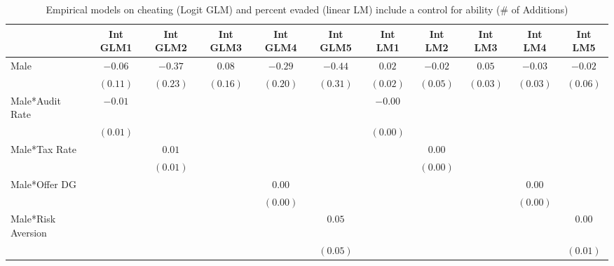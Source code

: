 
\begin{table}
\caption{Empirical models on cheating (Logit GLM) and percent evaded (linear LM) include a control for ability (\# of Additions)}
\begin{center}
\begin{tabular}{l c c c c c c c c c c }
\hline
 & Int GLM1 &  Int GLM2  & Int GLM3 & Int GLM4 & Int GLM5 & Int LM1 &  Int LM2  & Int LM3 & Int LM4 & Int LM5 \\
\hline
Male               & $-0.06$       & $-0.37$      & $0.08$        & $-0.29$       & $-0.44$      & $0.02$        & $-0.02$      & $0.05$        & $-0.03$       & $-0.02$      \\
                   & $(0.11)$      & $(0.23)$     & $(0.16)$      & $(0.20)$      & $(0.31)$     & $(0.02)$      & $(0.05)$     & $(0.03)$      & $(0.03)$      & $(0.06)$     \\
Male*Audit Rate    & $-0.01$       &              &               &               &              & $-0.00$       &              &               &               &              \\
                   & $(0.01)$      &              &               &               &              & $(0.00)$      &              &               &               &              \\
Male*Tax Rate      &               & $0.01$       &               &               &              &               & $0.00$       &               &               &              \\
                   &               & $(0.01)$     &               &               &              &               & $(0.00)$     &               &               &              \\
Male*Offer DG      &               &              &               & $0.00$        &              &               &              &               & $0.00$        &              \\
                   &               &              &               & $(0.00)$      &              &               &              &               & $(0.00)$      &              \\
Male*Risk Aversion &               &              &               &               & $0.05$       &               &              &               &               & $0.00$       \\
                   &               &              &               &               & $(0.05)$     &               &              &               &               & $(0.01)$     \\

\end{tabular}
\end{center}
\end{table}
